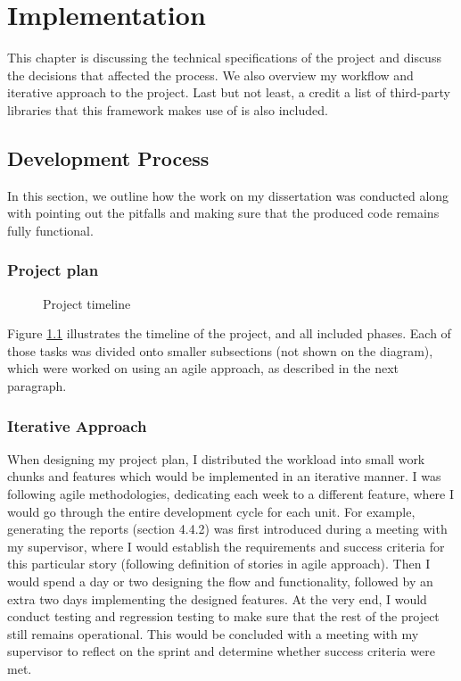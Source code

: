 \chapter{Implementation\label{chap:implementation}}
This chapter is discussing the technical specifications of the project and discuss the decisions that affected the process. We also overview my workflow and iterative approach to the project. Last but not least, a credit a list of third-party libraries that this framework makes use of is also included.

\section{Development Process}

In this section, we outline how the work on my dissertation was conducted along with pointing out the pitfalls and making sure that the produced code remains fully functional.

\subsection{Project plan}

\begin{figure}[h]
    \centering
    \caption{Project timeline}
    \label{fig:timeline}
\end{figure}

Figure \ref{fig:timeline} illustrates the timeline of the project, and all included phases. Each of those tasks was divided onto smaller subsections (not shown on the diagram), which were worked on using an agile approach, as described in the next paragraph.

\subsection{Iterative Approach}

When designing my project plan, I distributed the workload into small work chunks and features which would be implemented in an iterative manner. I was following agile methodologies, dedicating each week to a different feature, where I would go through the entire development cycle for each unit. For example, generating the reports (section 4.4.2) was first introduced during a meeting with my supervisor, where I would establish the requirements and success criteria for this particular story (following definition of stories in agile approach). Then I would spend a day or two designing the flow and functionality, followed by an extra two days implementing the designed features. At the very end, I would conduct testing and regression testing to make sure that the rest of the project still remains operational. This would be concluded with a meeting with my supervisor to reflect on the sprint and determine whether success criteria were met.

